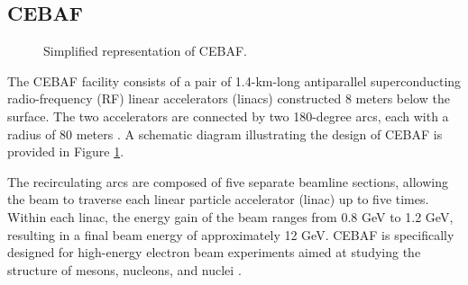 \subsection{CEBAF}
\label{11.100::cebaf}
    \begin{figure}[b!]
        \caption[CEBAF.]
        {Simplified representation of CEBAF.}
        \label{fig::11.100::cebaf}
    \end{figure}

    The CEBAF facility consists of a pair of 1.4-km-long antiparallel superconducting radio-frequency (RF) linear accelerators (linacs) constructed 8 meters below the surface.
    The two accelerators are connected by two 180-degree arcs, each with a radius of 80 meters \cite{leemann2001}.
    A schematic diagram illustrating the design of CEBAF is provided in Figure \ref{fig::11.100::cebaf}.

    The recirculating arcs are composed of five separate beamline sections, allowing the beam to traverse each linear particle accelerator (linac) up to five times.
    Within each linac, the energy gain of the beam ranges from 0.8 GeV to 1.2 GeV, resulting in a final beam energy of approximately 12 GeV.
    CEBAF is specifically designed for high-energy electron beam experiments aimed at studying the structure of mesons, nucleons, and nuclei \cite{rode2010}.
